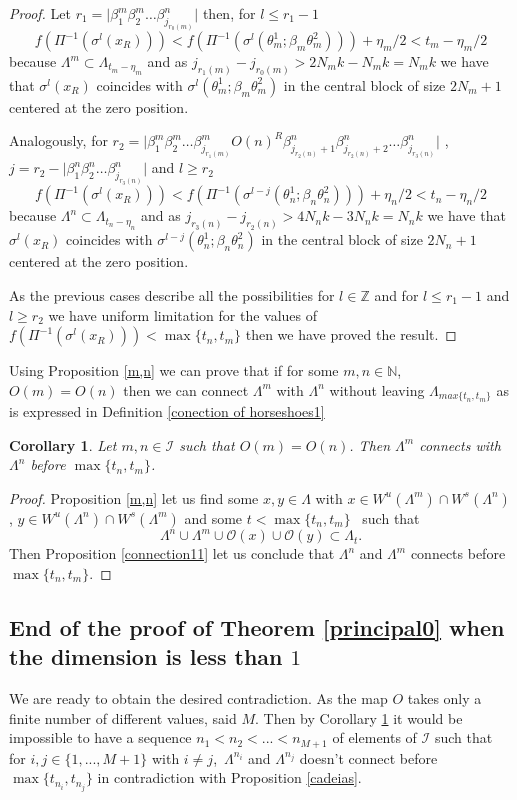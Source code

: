 \documentclass[12pt]{amsart}
\providecommand{\abs}[1]{\lvert#1\rvert}
\theoremstyle{plain} %
\newtheorem{corollary}[theorem]{Corollary}
\theoremstyle{definition} %
\numberwithin{equation}{section}
\begin{document}
\begin{proof}
Let $r_1=\abs{\beta^m_1\beta^m_2\dots \beta^n_{j_{r_0(m)}}}$ then, for $l\leq r_1-1$
$$f(\Pi^{-1}(\sigma^l(x_R)))<f(\Pi^{-1}(\sigma^l(\theta_m^{1};\beta_m\theta_m^{2})))+\eta_m/2<t_m-\eta_m/2$$
because $\Lambda^{m}\subset \Lambda_{t_m-\eta_m}$ and as $j_{r_1(m)}-j_{r_0(m)}>2N_mk-N_mk=N_mk$ we have that $\sigma^l(x_R)$ coincides with $\sigma^l(\theta_m^{1};\beta_m\theta_m^{2})$ in the central block of size $2N_m+1$ centered at the zero position.  

Analogously, for $r_2=\abs{\beta^m_1\beta^m_2\dots\beta^m_{j_{r_1(m)}}O(n)^R \beta^n_{j_{r_2(n)}+1}\beta^n_{j_{r_2(n)}+2}\dots\beta^n_{j_{r_3(n)}}}$ , $j=r_2-\abs{\beta^n_1\beta^n_2\dots\beta^n_{j_{r_3(n)}}}$ and $l\geq r_2$
$$f(\Pi^{-1}(\sigma^l(x_R)))<f(\Pi^{-1}(\sigma^{l-j}(\theta_n^{1};\beta_n\theta_n^{2})))+\eta_n/2<t_n-\eta_n/2$$
because $\Lambda^{n}\subset \Lambda_{t_n-\eta_n}$ and as $j_{r_3(n)}-j_{r_2(n)}>4N_nk-3N_nk=N_nk$ we have that $\sigma^l(x_R)$ coincides with $\sigma^{l-j}(\theta_n^{1};\beta_n\theta_n^{2})$ in the central block of size $2N_n+1$ centered at the zero position.   

As the previous cases describe all the possibilities for $l\in \mathbb{Z}$ and for $l\leq r_1-1$ and $l\geq r_2$
we have uniform limitation for the values of $f(\Pi^{-1}(\sigma^l(x_R)))<\max\{t_n,t_m\}$ then we have proved the result.
\end{proof}

 Using Proposition \ref{m,n} we can prove that if for some $m,n\in \mathbb{N}$, $O(m)=O(n)$ then we can connect $\Lambda^m$ with $\Lambda^n$ without leaving $\Lambda_{max\{t_n,t_m\}}$ as is expressed in Definition \ref{conection of horseshoes1}
 
 \begin{corollary}\label{contradiction}
 Let $m,n\in \mathcal{I}$ such that $O(m)=O(n)$. Then $\Lambda^m$ connects with $\Lambda^n$ before $\max\{t_n,t_m\}$.
 \end{corollary}
 
 
 \begin{proof}
 Proposition \ref{m,n} let us find some $x,y \in \Lambda$ with $x\in W^u(\Lambda^m)\cap W^s(\Lambda^n)$, $y\in W^u(\Lambda^n)\cap W^s(\Lambda^m)$ and some $t<\max\{t_n,t_m\}$ \ such that 
$$\Lambda^n \cup \Lambda^m \cup \mathcal{O}(x) \cup \mathcal{O}(y) \subset \Lambda_t.$$ 
Then Proposition \ref{connection11} let us conclude that $\Lambda^n$ and $\Lambda^m$ connects before $\max\{t_n,t_m\}$. 
 \end{proof}

 \subsection{End of the proof of Theorem \ref{principal0} when the dimension is less than $1$}
We are ready to obtain the desired contradiction. As the map $O$ takes only a finite number of different values, said $M$.  Then by Corollary \ref{contradiction} it would be impossible to have a sequence $n_1<n_2<...<n_{M+1}$ of elements of $\mathcal{I}$ such that for $i,j\in  \{1,...,M+1 \}$ with $i\neq j$,\ $\Lambda^{n_i}$ and $\Lambda^{{n_j}}$ doesn't connect before $\max \{ t_{n_i}, t_{n_j}\}$ in contradiction with Proposition \ref{cadeias}.
\end{document}
